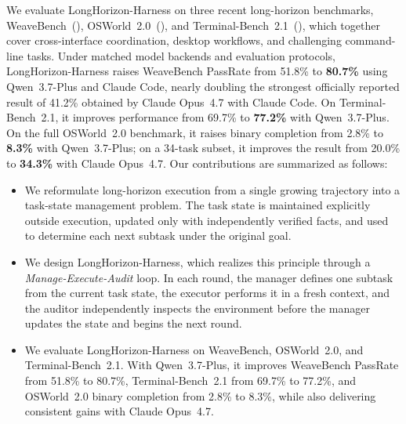 \documentclass[]{fairmeta}
\renewcommand{\cite}[1]{(\citealp{#1})}
\begin{document}
We evaluate LongHorizon-Harness on three recent long-horizon benchmarks, WeaveBench~\cite{weavebench}, OSWorld~2.0~\cite{osworld2}, and Terminal-Bench~2.1~\cite{terminalbench}, which together cover cross-interface coordination, desktop workflows, and challenging command-line tasks. Under matched model backends and evaluation protocols, LongHorizon-Harness raises WeaveBench PassRate from 51.8\% to \textbf{80.7\%} using Qwen~3.7-Plus and Claude Code, nearly doubling the strongest officially reported result of 41.2\% obtained by Claude Opus~4.7 with Claude Code. On Terminal-Bench~2.1, it improves performance from 69.7\% to \textbf{77.2\%} with Qwen~3.7-Plus. On the full OSWorld~2.0 benchmark, it raises binary completion from 2.8\% to \textbf{8.3\%} with Qwen~3.7-Plus; on a 34-task subset, it improves the result from 20.0\% to \textbf{34.3\%} with Claude Opus~4.7. Our contributions are summarized as follows:

\begin{itemize}[nosep]
    \item We reformulate long-horizon execution from a single growing trajectory into a task-state management problem. The task state is maintained explicitly outside execution, updated only with independently verified facts, and used to determine each next subtask under the original goal.

    \item We design LongHorizon-Harness, which realizes this principle through a \emph{Manage-Execute-Audit} loop. In each round, the manager defines one subtask from the current task state, the executor performs it in a fresh context, and the auditor independently inspects the environment before the manager updates the state and begins the next round.

    \item We evaluate LongHorizon-Harness on WeaveBench, OSWorld~2.0, and Terminal-Bench~2.1. With Qwen~3.7-Plus, it improves WeaveBench PassRate from 51.8\% to 80.7\%, Terminal-Bench~2.1 from 69.7\% to 77.2\%, and OSWorld~2.0 binary completion from 2.8\% to 8.3\%, while also delivering consistent gains with Claude Opus~4.7.
\end{itemize}
\end{document}
